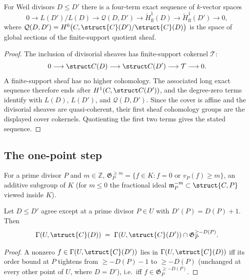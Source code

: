\begin{proposition}
  \label{thm:adelic_twist_exact_sequence}
  For Weil divisors \(D \le D'\) there is a four-term exact sequence of
  \(k\)-vector spaces
  \[
    0 \longrightarrow L(D')/L(D)
      \longrightarrow \mathcal{Q}(D, D')
      \longrightarrow \check{H}^1_{\mathrm{ff}}(D)
      \longrightarrow \check{H}^1_{\mathrm{ff}}(D')
      \longrightarrow 0,
  \]
  where \(\mathcal{Q}(D, D') = H^0\bigl(C, \struct{C}(D')/\struct{C}(D)\bigr)\)
  is the space of global sections of the finite-support quotient sheaf.
\end{proposition}
\begin{proof}
  The inclusion of divisorial sheaves has finite-support cokernel
  \(\mathcal T\):
  \[
    0\longrightarrow\struct C(D)\longrightarrow\struct C(D')
      \longrightarrow\mathcal T\longrightarrow0.
  \]
  A finite-support sheaf has no higher cohomology.  The associated long
  exact sequence therefore ends after \(H^1(C,\struct C(D'))\), and the
  degree-zero terms identify with \(L(D)\), \(L(D')\), and
  \(\mathcal Q(D,D')\).  Since the cover is affine and the divisorial
  sheaves are quasi-coherent, their first sheaf cohomology groups are the
  displayed cover cokernels.  Quotienting the first two terms gives the
  stated sequence.
\end{proof}

\subsection{The one-point step}

\begin{definition}
  \label{def:adelic_orderGe}
  \leanok
  For a prime divisor \(P\) and \(m \in \mathbb{Z}\),
  \(\mathfrak G_P^{\ge m} = \{ f \in K : f = 0 \text{ or } v_P(f) \ge m
  \}\), an additive subgroup of \(K\) (for \(m \le 0\) the fractional
  ideal \(\mathfrak m_P^{-m} \subset \struct{C,P}\) viewed inside \(K\)).
\end{definition}

\begin{theorem}
  \label{thm:adelic_local_step_identity}
  \leanok
  Let \(D \le D'\) agree except at a prime divisor \(P \in U\) with
  \(D'(P) = D(P) + 1\). Then
  \[
    \Gamma(U, \struct{C}(D)) \;=\; \Gamma(U, \struct{C}(D')) \cap
      \mathfrak G_P^{\ge -D(P)}.
  \]
\end{theorem}
\begin{proof}
  \leanok
  A nonzero \(f \in \Gamma(U, \struct{C}(D'))\) lies in \(\Gamma(U,
  \struct{C}(D))\) iff its order bound at \(P\) tightens from \(\ge
  -D(P)-1\) to \(\ge -D(P)\) (unchanged at every other point of \(U\),
  where \(D = D'\)), i.e.\ iff \(f \in \mathfrak G_P^{\ge -D(P)}\).
\end{proof}

